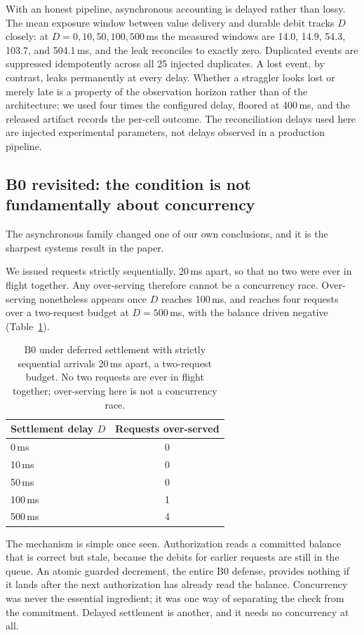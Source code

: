 \documentclass[preprint,3p,authoryear,12pt]{elsarticle}
\begin{document}
With an honest pipeline, asynchronous accounting is delayed rather than lossy. The mean
exposure window between value delivery and durable debit tracks $D$ closely: at $D = 0,
10, 50, 100, 500$\,ms the measured windows are 14.0, 14.9, 54.3, 103.7, and 504.1\,ms, and
the leak reconciles to exactly zero. Duplicated events are suppressed idempotently across
all 25 injected duplicates. A lost event, by contrast, leaks permanently at every delay.
Whether a straggler looks lost or merely late is a property of the observation horizon
rather than of the architecture; we used four times the configured delay, floored at
400\,ms, and the released artifact records the per-cell outcome. The reconciliation
delays used here are injected experimental parameters, not delays observed in a
production pipeline.

\subsection{B0 revisited: the condition is not fundamentally about concurrency}
\label{sec:b0revised}
The asynchronous family changed one of our own conclusions, and it is the sharpest
systems result in the paper.

We issued requests strictly sequentially, 20\,ms apart, so that no two were ever in
flight together. Any over-serving therefore cannot be a concurrency race. Over-serving
nonetheless appears once $D$ reaches 100\,ms, and reaches four requests over a
two-request budget at $D = 500$\,ms, with the balance driven negative
(Table~\ref{tab:asyncb0}).

\begin{table}[t]
\centering
\caption{B0 under deferred settlement with strictly sequential arrivals 20\,ms apart, a
two-request budget. No two requests are ever in flight together; over-serving here is
not a concurrency race.}
\label{tab:asyncb0}
\begin{tabular}{lc}
\toprule
Settlement delay $D$ & Requests over-served \\
\midrule
0\,ms & 0 \\
10\,ms & 0 \\
50\,ms & 0 \\
100\,ms & 1 \\
500\,ms & 4 \\
\bottomrule
\end{tabular}
\end{table}

The mechanism is simple once seen. Authorization reads a committed balance that is
correct but stale, because the debits for earlier requests are still in the queue. An
atomic guarded decrement, the entire B0 defense, provides nothing if it lands after
the next authorization has already read the balance. Concurrency was never the essential
ingredient; it was one way of separating the check from the commitment. Delayed
settlement is another, and it needs no concurrency at all.
\end{document}
